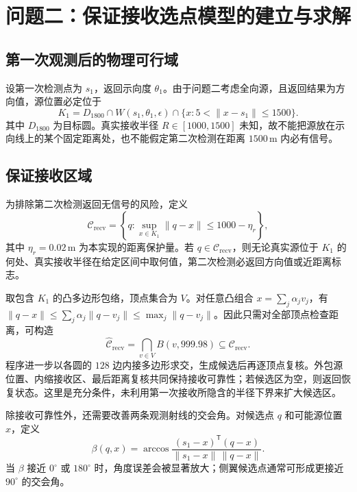 \section{问题二：保证接收选点模型的建立与求解}

\subsection{第一次观测后的物理可行域}
设第一次检测点为 $s_1$，返回示向度 $\theta_1$。由于问题二考虑全向源，且返回结果为方向值，源位置必定位于
\begin{equation}
  K_1=D_{1800}\cap W(s_1,\theta_1,\epsilon)
  \cap\{x:5<\|x-s_1\|\leq1500\}.
  \label{eq:first-feasible-set}
\end{equation}
其中 $D_{1800}$ 为目标圆。真实接收半径 $R\in[1000,1500]$ 未知，故不能把源放在示向线上的某个固定距离处，也不能假定第二次检测在距离 $1500\,\mathrm{m}$ 内必有信号。

\subsection{保证接收区域}
为排除第二次检测返回无信号的风险，定义
\begin{equation}
  \mathcal C_{\mathrm{recv}}=
  \left\{q:\sup_{x\in K_1}\|q-x\|\leq1000-\eta_r\right\},
  \label{eq:guaranteed-reception}
\end{equation}
其中 $\eta_r=0.02\,\mathrm{m}$ 为本实现的距离保护量。若 $q\in\mathcal C_{\mathrm{recv}}$，则无论真实源位于 $K_1$ 的何处、真实接收半径在给定区间中取何值，第二次检测必返回方向值或近距离标志。

取包含 $K_1$ 的凸多边形包络，顶点集合为 $V$。对任意凸组合 $x=\sum_j\alpha_jv_j$，有 $\|q-x\|\leq\sum_j\alpha_j\|q-v_j\|\leq\max_j\|q-v_j\|$。因此只需对全部顶点检查距离，可构造
\begin{equation}
 \widehat{\mathcal C}_{\mathrm{recv}}=\bigcap_{v\in V}B(v,999.98)\subseteq\mathcal C_{\mathrm{recv}}.
\end{equation}
程序进一步以各圆的 $128$ 边内接多边形求交，生成候选后再逐顶点复核。外包源位置、内缩接收区、最后距离复核共同保持接收可靠性；若候选区为空，则返回恢复状态。这里是充分条件，未利用第一次接收所隐含的半径下界来扩大候选区。

除接收可靠性外，还需要改善两条观测射线的交会角。对候选点 $q$ 和可能源位置 $x$，定义
\begin{equation}
  \beta(q,x)=\arccos
  \frac{(s_1-x)^{\mathsf T}(q-x)}{\|s_1-x\|\,\|q-x\|}.
\end{equation}
当 $\beta$ 接近 $0^\circ$ 或 $180^\circ$ 时，角度误差会被显著放大；侧翼候选点通常可形成更接近 $90^\circ$ 的交会角。

